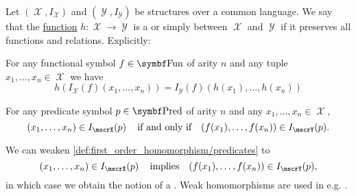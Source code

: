 \begin{definition}\label{def:first_order_homomorphism}
  Let \( (\mscrX, I_{\mscrX}) \) and \( (\mscrY, I_{\mscrY}) \) be structures over a common language. We say that the \hyperref[def:function]{function} \( h: \mscrX \to \mscrY \) is a  or simply  between \( \mscrX \) and \( \mscrY \) if it preserves all functions and relations. Explicitly:
  \begin{DefEnum}
     For any functional symbol \( f \in \Bold{Fun} \) of arity \( n \) and any tuple \( x_1, \ldots, x_n \in \mscrX \) we have
    \begin{equation}\label{eq:def:first_order_homomorphism/functions}
      h(I_{\mscrX}(f)(x_1, \ldots, x_n)) = I_{\mscrY}(f)(h(x_1), \ldots, h(x_n))
    \end{equation}

     For any predicate symbol \( p \in \Bold{Pred} \) of arity \( n \) and any \( x_1, \ldots, x_n \in \mscrX \),
    \begin{equation}\label{eq:def:first_order_homomorphism/predicates}
      (x_1, \ldots, x_n) \in I_{\mscrX}(p) \quad\T{if and only if}\quad (f(x_1), \ldots, f(x_n)) \in I_{\mscrY}(p).
    \end{equation}

     We can weaken \ref{def:first_order_homomorphism/predicates} to
    \begin{equation}\label{eq:def:first_order_homomorphism/predicates_weak}
      (x_1, \ldots, x_n) \in I_{\mscrX}(p) \quad\T{implies}\quad (f(x_1), \ldots, f(x_n)) \in I_{\mscrY}(p),
    \end{equation}
    in which case we obtain the notion of a . Weak homomorphisms are used in e.g. .
  \end{DefEnum}
\end{definition}

